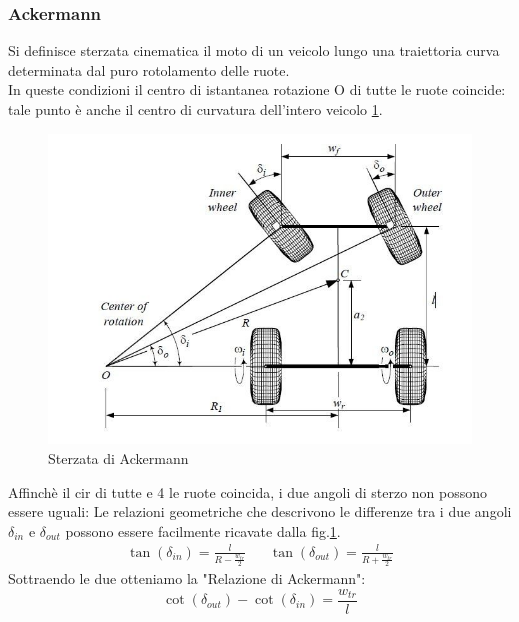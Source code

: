 \subsubsection{Ackermann} \label{Ackermann}
Si definisce sterzata cinematica il moto di un veicolo lungo una traiettoria curva determinata dal puro rotolamento delle ruote.\\
In queste condizioni il centro di istantanea
rotazione O di tutte le ruote coincide: tale punto è anche il centro di curvatura 
dell’intero veicolo \ref{fig:Ackermann}.\\
\begin{figure}[ht]
    \centering
    \includegraphics[scale=0.4]{Immagini/Lateral dynamics/Angolo-di-Ackermann.jpg}
    \caption{Sterzata di Ackermann}
    \label{fig:Ackermann}
\end{figure}
Affinchè il cir di tutte e 4 le ruote coincida, i due angoli di sterzo non possono essere uguali:
Le relazioni geometriche che descrivono le differenze tra i due angoli $\delta_{in}$ e $\delta_{out}$ possono essere facilmente ricavate dalla fig.\ref{fig:Ackermann}.\\
\begin{align*}
\tan(\delta_{in}) = \frac{l}{R-\frac{w_{tr}}{2}} &&  \tan(\delta_{out}) = \frac{l}{R+\frac{w_{tr}}{2}}
\end{align*}
Sottraendo le due otteniamo la "Relazione di Ackermann":
\begin{equation}
    \cot{(\delta_{out})} - \cot{(\delta_{in})} = \frac{w_{tr}}{l}
\end{equation}


